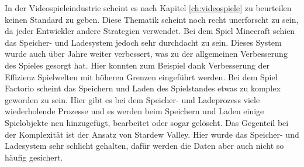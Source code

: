 In der Videospieleindustrie scheint es nach Kapitel \ref{ch:videospiele} zu beurteilen keinen Standard zu geben. Diese Thematik scheint noch recht unerforscht zu sein, da jeder Entwickler andere Strategien verwendet. Bei dem Spiel Minecraft schien das Speicher- und Ladesystem jedoch sehr durchdacht zu sein. Dieses System wurde auch über Jahre weiter verbessert, was zu der allgemeinen Verbesserung des Spieles gesorgt hat. Hier konnten zum Beispiel dank Verbesserung der Effizienz Spielwelten mit höheren Grenzen eingeführt werden. Bei dem Spiel Factorio scheint das Speichern und Laden des Spielstandes etwas zu komplex geworden zu sein. Hier gibt es bei dem Speicher- und Ladeprozess viele wiederholende Prozesse und es werden beim Speichern und Laden einige Spielobjekte neu hinzugefügt, bearbeitet oder sogar gelöscht. Das Gegenteil bei der Komplexität ist der Ansatz von Stardew Valley. Hier wurde das Speicher- und Ladesystem sehr schlicht gehalten, dafür werden die Daten aber auch nicht so häufig gesichert. 


